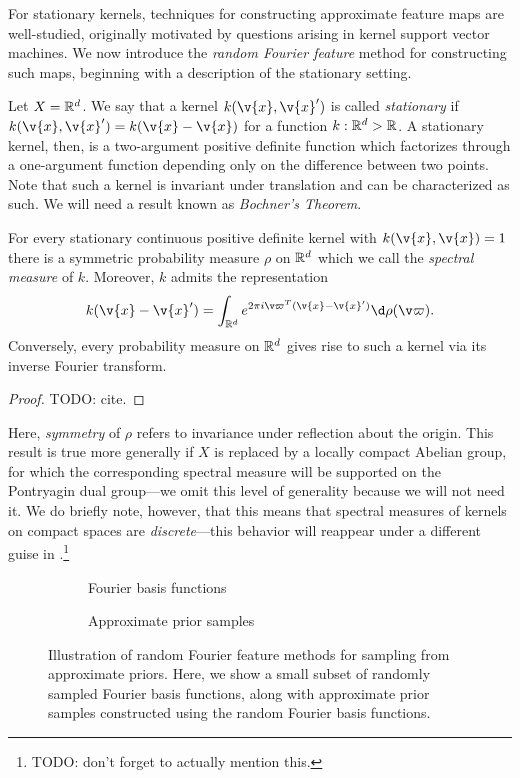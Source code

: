 \documentclass[11pt]{book}
\begin{document}
For stationary kernels, techniques for constructing approximate feature maps are well-studied, originally motivated by questions arising in kernel support vector machines.
We now introduce the \emph{random Fourier feature} method for constructing such maps, beginning with a description of the stationary setting.

Let $X = \mathbb{R}^d$.
We say that a kernel $k(\v{x},\v{x}')$ is called \emph{stationary} if $k(\v{x},\v{x}') = k(\v{x} - \v{x})$ for a function $k : \mathbb{R}^d \-> \mathbb{R}$.
A stationary kernel, then, is a two-argument positive definite function which factorizes through a one-argument function depending only on the difference between two points.
Note that such a kernel is invariant under translation and can be characterized as such.
We will need a result known as \emph{Bochner's Theorem}.

\begin{result}
For every stationary continuous positive definite kernel with $k(\v{x},\v{x}) = 1$ there is a symmetric probability measure $\rho$ on $\mathbb{R}^d$ which we call the \emph{spectral measure} of $k$.
Moreover, $k$ admits the representation
\[
k(\v{x} - \v{x}') = \int_{\R^d} e^{2\pi i \v\varpi^T (\v{x} - \v{x}')} \d\rho(\v\varpi)
.
\]
Conversely, every probability measure on $\mathbb{R}^d$ gives rise to such a kernel via its inverse Fourier transform.
\end{result}

\begin{proof}
TODO: cite.
\end{proof}

Here, \emph{symmetry} of $\rho$ refers to invariance under reflection about the origin.
This result is true more generally if $X$ is replaced by a locally compact Abelian group, for which the corresponding spectral measure will be supported on the Pontryagin dual group---we omit this level of generality because we will not need it.
We do briefly note, however, that this means that spectral measures of kernels on compact spaces are \emph{discrete}---this behavior will reappear under a different guise in .\footnote{TODO: don't forget to actually mention this.}

\begin{figure}
\begin{subfigure}{0.49\textwidth}

\caption{Fourier basis functions}
\end{subfigure}
\begin{subfigure}{0.49\textwidth}

\caption{Approximate prior samples}
\end{subfigure}
\caption{Illustration of random Fourier feature methods for sampling from approximate priors. Here, we show a small subset of randomly sampled Fourier basis functions, along with approximate prior samples constructed using the random Fourier basis functions.}
\label{fig:gp-rff-prior}
\end{figure}
\end{document}
